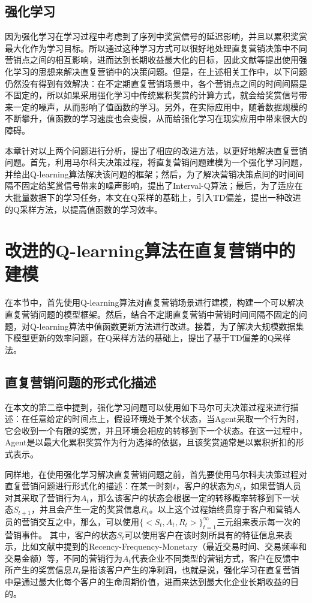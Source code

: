\subsection{强化学习}
因为强化学习在学习过程中考虑到了序列中奖赏信号的延迟影响，并且以累积奖赏最大化作为学习目标。所以通过这种学习方式可以很好地处理直复营销决策中不同营销点之间的相互影响，进而达到长期收益最大化的目标，因此文献\citep{pednault2002sequential,archak2010budget,boutilier2016budget}等提出使用强化学习的思想来解决直复营销中的决策问题。但是，在上述相关工作中，以下问题仍然没有得到有效解决：在不定期直复营销场景中，各个营销点之间的时间间隔是不固定的，所以如果采用强化学习中传统累积奖赏的计算方式，就会给奖赏信号带来一定的噪声，从而影响了值函数的学习。另外，在实际应用中，随着数据规模的不断攀升，值函数的学习速度也会变慢，从而给强化学习在现实应用中带来很大的障碍。

本章针对以上两个问题进行分析，提出了相应的改进方法，以更好地解决直复营销问题。首先，利用马尔科夫决策过程，将直复营销问题建模为一个强化学习问题，并给出Q-learning算法解决该问题的框架；然后，为了解决营销决策点间的时间间隔不固定给奖赏信号带来的噪声影响，提出了Interval-Q算法；最后，为了适应在大批量数据下的学习任务，本文在Q采样的基础上，引入TD偏差，提出一种改进的Q采样方法，以提高值函数的学习效率。

\section{改进的Q-learning算法在直复营销中的建模}
在本节中，首先使用Q-learning算法对直复营销场景进行建模，构建一个可以解决直复营销问题的模型框架。然后，结合不定期直复营销中营销时间间隔不固定的问题，对Q-learning算法中值函数更新方法进行改进。接着，为了解决大规模数据集下模型更新的效率问题，在Q采样方法的基础上，提出了基于TD偏差的Q采样法。

\subsection{直复营销问题的形式化描述}
在本文的第二章中提到，强化学习问题可以使用如下马尔可夫决策过程来进行描述：在任意给定的时间点上，假设环境处于某个状态，当Agent采取一个行为时，它会收到一个有限的奖赏，并且环境会相应的转移到下一个状态。在这一过程中，Agent是以最大化累积奖赏作为行为选择的依据，且该奖赏通常是以累积折扣的形式表示。

同样地，在使用强化学习解决直复营销问题之前，首先要使用马尔科夫决策过程对直复营销问题进行形式化的描述：在某一时刻$t$，客户的状态为$S_{t}$，如果营销人员对其采取了营销行为$A_{t}$，那么该客户的状态会根据一定的转移概率转移到下一状态$S_{t+1}$，并且会产生一定的奖赏信息$R_{t}$。以上这个过程始终贯穿于客户和营销人员的营销交互之中，那么，可以使用$\{<S_{t},A_{t},R_{t}>\}_{t=1}^{\infty}$三元组来表示每一次的营销事件。
其中，客户的状态$S_{t}$可以使用客户在该时刻所具有的特征信息来表示，比如文献\citep{tkachenko2015autonomous}中提到的Recency-Frequency-Monetary（最近交易时间、交易频率和交易金额）等，不同的营销行为$A_{t}$代表企业不同类型的营销方式，客户在反馈中所产生的奖赏信息$R_{t}$是指该客户产生的净利润，也就是说，强化学习在直复营销中是通过最大化每个客户的生命周期价值，进而来达到最大化企业长期收益的目的。

